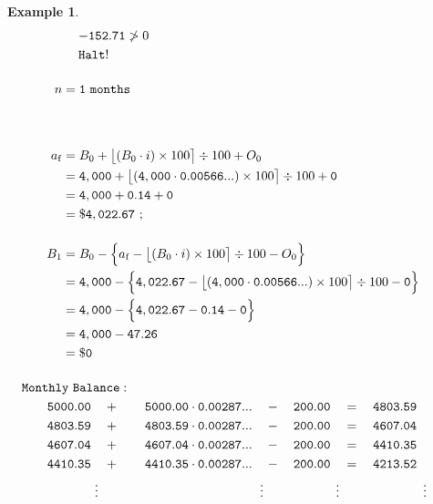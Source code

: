 \documentclass[12pt,letterpaper,oneside]{article}
\newtheorem{example}{Example}[section]
\theoremstyle{remark} %
\begin{document}
\begin{example}
\begin{align*}
	&\quad\;\mathtt{-152.71}\ngtr 0\\
	&\quad\;\mathtt{Halt!}\\[12pt]
	n&=\mathtt{\monthspitf\ months}\\[36pt] %
	a_{\rm{f}}&=B_{\monthsitf}+\big\lfloor{\left(B_{\monthsitf}\cdot i\right)\times 100}\big\rceil\div 100+O_{\monthsitf}\\
	&=\mathtt{\balanceitf}+\big\lfloor{\left(\mathtt{\balanceitf}\cdot \mathtt{\rate}\right)\times 100}\big\rceil\div 100+\mathtt{\interestitf}\\
	&=\mathtt{\balanceitf}+\mathtt{0.14}+\mathtt{\interestitf}\\
	&=\mathtt{\$\amountfinal}\ ;\\[12pt]
	B_{\monthspitf}&=B_{\monthsitf}-\Big\{a_{\rm{f}}-\big\lfloor{\left(B_{\monthsitf}\cdot i\right)\times 100}\big\rceil\div 100-O_{\monthsitf}\Big\}\\
	&=\mathtt{\balanceitf}-\Big\{\mathtt{\amountfinal}-\big\lfloor{\left(\mathtt{\balanceitf}\cdot \mathtt{\rate}\right)\times 100}\big\rceil\div 100-\mathtt{\interestitf}\Big\}\\
	&=\mathtt{\balanceitf}-\Big\{\mathtt{\amountfinal}-\mathtt{0.14}-\mathtt{\interestitf}\Big\}\\
	&=\mathtt{\balanceitf}-\mathtt{47.26}\\
	&=\mathtt{\$0}\\[12pt]
	&\!\!\!\!\!\!\!\!\!\!\!\!\!\!\!\!\!\!\!\mathtt{Monthly\ Balance:}\\
	&\!\!\!\!\!\!\!\mathtt{5000.00}\quad +\qquad\mathtt{5000.00}\cdot \mathtt{0.00287...}\quad -\quad \mathtt{200.00}\quad =\quad \mathtt{4803.59}\\
	&\!\!\!\!\!\!\!\mathtt{4803.59}\quad +\qquad\mathtt{4803.59}\cdot \mathtt{0.00287...}\quad -\quad \mathtt{200.00}\quad =\quad \mathtt{4607.04}\\
	&\!\!\!\!\!\!\!\mathtt{4607.04}\quad +\qquad\mathtt{4607.04}\cdot \mathtt{0.00287...}\quad -\quad \mathtt{200.00}\quad =\quad\mathtt{4410.35}\\
	&\!\!\!\!\!\!\!\mathtt{4410.35}\quad +\qquad\mathtt{4410.35}\cdot \mathtt{0.00287...}\quad -\quad \mathtt{200.00}\quad =\quad \mathtt{4213.52}\\
	&\qquad\ \:\vdots\qquad\qquad\qquad\qquad\qquad\quad\ \ \ \ \ \vdots\qquad\qquad\quad\ \ \vdots\qquad\qquad\qquad\:\ \vdots\\

\end{align*}
\end{example}
\end{document}
